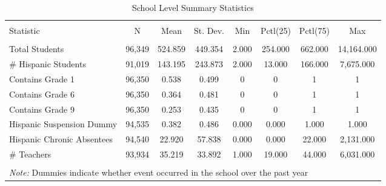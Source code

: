 
\begin{table}[!htbp] \centering 
  \caption{School Level Summary Statistics} 
  \label{} 
\begin{tabular}{@{\extracolsep{5pt}}lccccccc} 
\\[-1.8ex]\hline 
\hline \\[-1.8ex] 
Statistic & \multicolumn{1}{c}{N} & \multicolumn{1}{c}{Mean} & \multicolumn{1}{c}{St. Dev.} & \multicolumn{1}{c}{Min} & \multicolumn{1}{c}{Pctl(25)} & \multicolumn{1}{c}{Pctl(75)} & \multicolumn{1}{c}{Max} \\ 
\hline \\[-1.8ex] 
Total Students & 96,349 & 524.859 & 449.354 & 2.000 & 254.000 & 662.000 & 14,164.000 \\ 
\# Hispanic Students & 91,019 & 143.195 & 243.873 & 2.000 & 13.000 & 166.000 & 7,675.000 \\ 
Contains Grade 1 & 96,350 & 0.538 & 0.499 & 0 & 0 & 1 & 1 \\ 
Contains Grade 6 & 96,350 & 0.364 & 0.481 & 0 & 0 & 1 & 1 \\ 
Contains Grade 9 & 96,350 & 0.253 & 0.435 & 0 & 0 & 1 & 1 \\ 
Hispanic Suspension Dummy & 94,535 & 0.382 & 0.486 & 0.000 & 0.000 & 1.000 & 1.000 \\ 
Hispanic Chronic Absentees & 94,540 & 22.920 & 57.838 & 0.000 & 0.000 & 22.000 & 2,131.000 \\ 
\# Teachers & 93,934 & 35.219 & 33.892 & 1.000 & 19.000 & 44.000 & 6,031.000 \\ 
\hline \\[-1.8ex] 
\multicolumn{8}{l}{\textit{Note:} Dummies indicate whether event occurred in the school over the past year} \\ 
\end{tabular} 
\end{table} 
